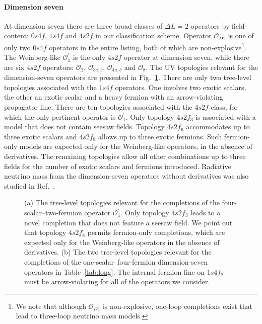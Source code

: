 \paragraph{Dimension seven} At dimension seven there are three broad classes of
$\Delta L = 2$ operators by field-content: $0s4f$, $1s4f$ and $4s2f$ in our
classification scheme. Operator $\mathcal{O}_{D1}$ is one of only two $0s4f$
operators in the entire listing, both of which are non-explosive\footnote{We
  note that although $\mathcal{O}_{D1}$ is non-explosive, one-loop completions
  exist that lead to three-loop neutrino mass models.}. The Weinberg-like
$\mathcal{O}_{1}^{\prime}$ is the only $4s2f$ operator at dimension seven, while
there are six $4s2f$ operators: $\mathcal{O}_{2}$, $\mathcal{O}_{3a,b}$,
$\mathcal{O}_{4a,b}$ and $\mathcal{O}_{8}$. The UV topologies relevant for the
dimension-seven operators are presented in Fig.~\ref{fig:d7-topologies}. There
are only two tree-level topologies associated with the $1s4f$ operators. One
involves two exotic scalars, the other an exotic scalar and a heavy fermion with
an arrow-violating propagator line. There are ten topologies associated with the
$4s2f$ class, for which the only pertinent operator is
$\mathcal{O}_{1}^{\prime}$. Only topology $4s2f_{3}$ is associated with a model
that does not contain seesaw fields. Topology $4s2f_{6}$ accommodates up to
three exotic scalars and $4s2f_{8}$ allows up to three exotic fermions. Such
fermion-only models are expected only for the Weinberg-like operators, in the
absence of derivatives. The remaining topologies allow all other combinations up
to three fields for the number of exotic scalars and fermions introduced.
Radiative neutrino mass from the dimension-seven operators without derivatives
was also studied in Ref.~\cite{Cai:2014kra}.

\begin{figure}[t]
  \centering
  \caption[(a) The tree-level topologies relevant for the completions of the
  four-scalar--two-fermion operator $\mathcal{O}_{1}^{\prime}$. (b) The two
  tree-level topologies relevant for the completions of the
  one-scalar--four-fermion dimension-seven operators in
  Table~\ref{tab:long}.]{(a) The tree-level topologies relevant for the
    completions of the four-scalar--two-fermion operator
    $\mathcal{O}_{1}^{\prime}$. Only topology $4s2f_{3}$ leads to a novel
    completion that does not feature a seesaw field. We point out that topology
    $4s2f_{8}$ permits fermion-only completions, which are expected only for the
    Weinberg-like operators in the absence of derivatives. (b) The two
    tree-level topologies relevant for the completions of the
    one-scalar--four-fermion dimension-seven operators in Table~\ref{tab:long}.
    The internal fermion line on $1s4f_{2}$ must be arrow-violating for all of
    the operators we consider.}
  \label{fig:d7-topologies}
\end{figure}

